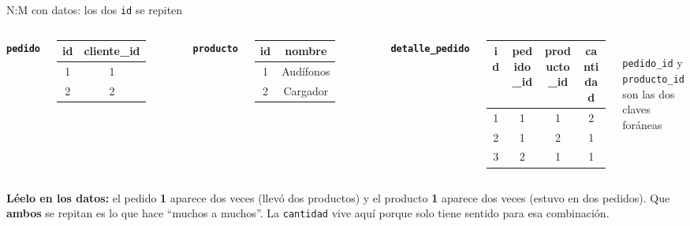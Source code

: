 \documentclass[aspectratio=169,10pt,c]{beamer}
\begin{document}
\begin{frame}{N:M con datos: los dos \texttt{id} se repiten}
\begin{columns}[T,onlytextwidth]
\centering
\footnotesize\texttt{\textbf{pedido}}\\[4pt]
\begin{tabular}{cc}
\toprule
\bfseries id & \bfseries cliente\_id \\
\midrule
1 & 1 \\
2 & 2 \\
\bottomrule
\end{tabular}
\vspace{10pt}

\footnotesize\texttt{\textbf{producto}}\\[4pt]
\begin{tabular}{cc}
\toprule
\bfseries id & \bfseries nombre \\
\midrule
1 & Audífonos \\
2 & Cargador \\
\bottomrule
\end{tabular}
\centering
\footnotesize\texttt{\textbf{detalle\_pedido}}\\[4pt]
\begin{tabular}{cccc}
\toprule
\bfseries id & \bfseries pedido\_id & \bfseries producto\_id & \bfseries cantidad \\
\midrule
1 & 1 & 1 & 2 \\
2 & 1 & 2 & 1 \\
3 & 2 & 1 & 1 \\
\bottomrule
\end{tabular}\\[4pt]
{\scriptsize \texttt{pedido\_id} y \texttt{producto\_id} son las dos claves foráneas}
\end{columns}
\vspace{0.35cm}
\small \textbf{Léelo en los datos:} el pedido \textbf{1} aparece dos veces (llevó dos productos) y el producto \textbf{1} aparece dos veces (estuvo en dos pedidos). Que \textbf{ambos} se repitan es lo que hace ``muchos a muchos''. La \texttt{cantidad} vive aquí porque solo tiene sentido para esa combinación.
\end{frame}
\end{document}
